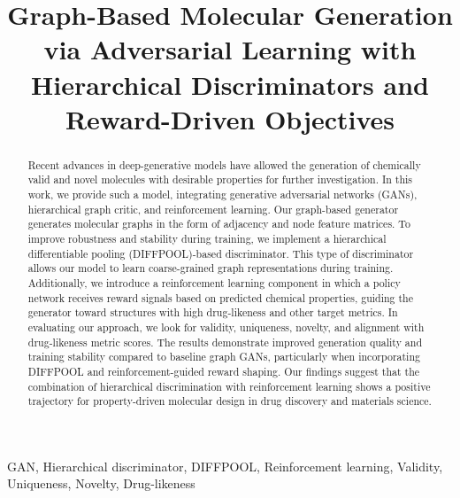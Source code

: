 \documentclass[conference]{IEEEtran}
\begin{document}
\title{Graph-Based Molecular Generation via Adversarial Learning with
Hierarchical Discriminators and Reward-Driven Objectives}

\author{
}


\maketitle

\begin{abstract}
Recent advances in deep-generative models have allowed the generation of chemically valid and novel molecules with 
desirable properties for further investigation. In this work, we provide such a model, integrating generative 
adversarial networks (GANs), hierarchical graph critic, and reinforcement learning. Our graph-based 
generator generates molecular graphs in the form of adjacency and node feature matrices. To improve robustness 
and stability during training, we implement a hierarchical differentiable pooling (DIFFPOOL)-based discriminator. 
This type of discriminator allows our model to learn coarse-grained graph representations during training. 
Additionally, we introduce a reinforcement learning component in which a policy network receives reward signals 
based on predicted chemical properties, guiding the generator toward structures with high drug-likeness and other 
target metrics. In evaluating our approach, we look for validity, uniqueness, novelty, and alignment with 
drug-likeness metric scores. The results demonstrate improved generation quality and training stability compared 
to baseline graph GANs, particularly when incorporating DIFFPOOL and reinforcement-guided reward shaping. 
Our findings suggest that the combination of hierarchical discrimination with reinforcement learning shows 
a positive trajectory for property-driven molecular design in drug discovery and materials science.
\end{abstract}

\begin{IEEEkeywords}
GAN, Hierarchical discriminator, DIFFPOOL, Reinforcement learning, Validity, Uniqueness, Novelty, Drug-likeness
\end{IEEEkeywords}
\end{document}
